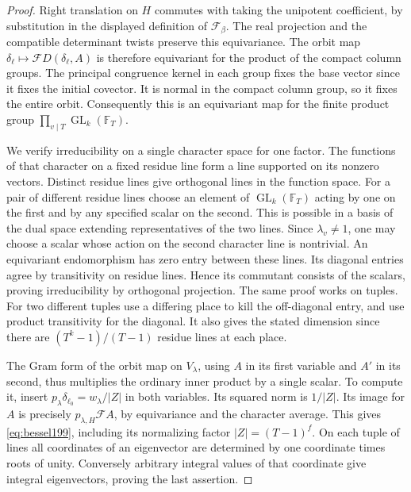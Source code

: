 \documentclass[a4paper,11pt]{article}
\theoremstyle{definition}
\theoremstyle{remark}
\numberwithin{equation}{section}
\newcommand{\GL}{\operatorname{GL}}
\begin{document}
\begin{proof}
Right translation on \(H\) commutes with taking the unipotent
coefficient, by substitution in the displayed definition of
\(\mathcal F_\beta\). The real projection and the compatible
determinant twists preserve this equivariance. The orbit map
\(\delta_\ell\mapsto\mathcal F D(\delta_\ell,A)\) is therefore
equivariant for the product of the compact column groups.
The principal congruence kernel in each group fixes the base
vector since it fixes the initial covector. It is normal in
the compact column group, so it fixes the entire orbit.
Consequently this is an equivariant map for the finite product
group \(\prod_{v\mid T}\GL_k(\mathbb F_T)\).

We verify irreducibility on a single character space for one
factor. The functions of that character on a fixed residue line
form a line supported on its nonzero vectors. Distinct residue
lines give orthogonal lines in the function space. For a pair
of different residue lines choose an element of \(\GL_k(\mathbb F_T)\)
acting by one on the first and by any specified scalar on the
second. This is possible in a basis of the dual space extending
representatives of the two lines. Since \(\lambda_v\ne1\), one
may choose a scalar whose action on the second character line
is nontrivial. An equivariant endomorphism has zero entry between
these lines. Its diagonal entries agree by transitivity on residue
lines. Hence its commutant consists of the scalars, proving
irreducibility by orthogonal projection. The same proof works on
tuples. For two different tuples use a differing place to kill
the off-diagonal entry, and use product transitivity for the
diagonal. It also gives the stated dimension since there are
\((T^k-1)/(T-1)\) residue lines at each place.

The Gram form of the orbit map on \(V_\lambda\), using \(A\) in
its first variable and \(A'\) in its second, thus multiplies the
ordinary inner product by a single scalar. To compute it, insert
\(p_\lambda\delta_{\ell_0}=w_\lambda/|Z|\) in both variables.
Its squared norm is \(1/|Z|\). Its image for \(A\) is precisely
\(p_{\lambda,H}\mathcal F A\), by equivariance and the character
average. This gives \eqref{eq:bessel199}, including its
normalizing factor \(|Z|=(T-1)^f\). On each tuple of lines all
coordinates of an eigenvector are determined by one coordinate
times roots of unity. Conversely arbitrary integral values of
that coordinate give integral eigenvectors, proving the last
assertion.
\end{proof}
\end{document}
